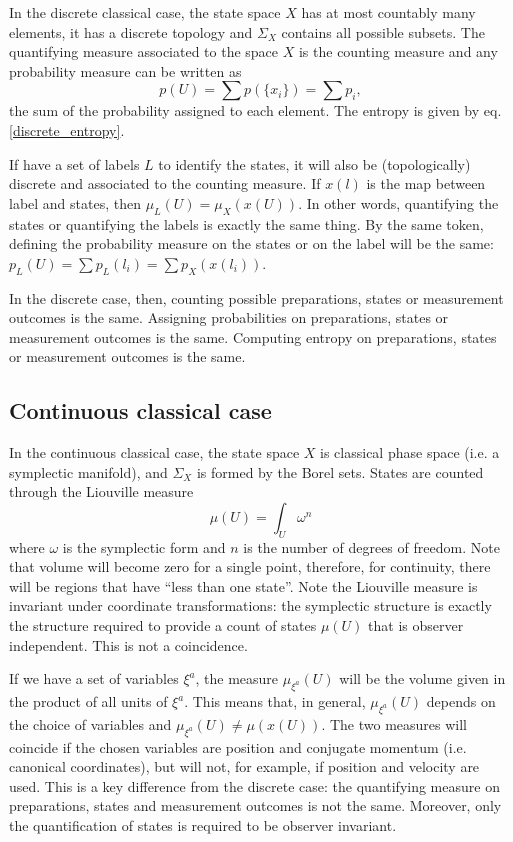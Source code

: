 \documentclass[10pt,twocolumn, nofootinbib]{revtex4-2}
\begin{document}
In the discrete classical case, the state space $X$ has at most countably many elements, it has a discrete topology and $\Sigma_X$ contains all possible subsets. The quantifying measure associated to the space $X$ is the counting measure and any probability measure can be written as
\begin{equation}
	p(U) = \sum p(\{x_i\}) = \sum p_i,
\end{equation}
the sum of the probability assigned to each element. The entropy is given by eq. \ref{discrete_entropy}.

If have a set of labels $L$ to identify the states, it will also be (topologically) discrete and associated to the counting measure. If $x(l)$ is the map between label and states, then $\mu_L(U) = \mu_X(x(U))$. In other words, quantifying the states or quantifying the labels is exactly the same thing. By the same token, defining the probability measure on the states or on the label will be the same: $p_L(U) = \sum p_L({l_i}) = \sum p_X(x(l_i))$.

In the discrete case, then, counting possible preparations, states or measurement outcomes is the same. Assigning probabilities on preparations, states or measurement outcomes is the same. Computing entropy on preparations, states or measurement outcomes is the same.

\subsection{Continuous classical case}
 
In the continuous classical case, the state space $X$ is classical phase space (i.e. a symplectic manifold), and $\Sigma_X$ is formed by the Borel sets. States are counted through the Liouville measure
\begin{equation}
	\mu(U) = \int_U \omega^n 
\end{equation}
where $\omega$ is the symplectic form and $n$ is the number of degrees of freedom. Note that volume will become zero for a single point, therefore, for continuity, there will be regions that have ``less than one state''. Note the Liouville measure is invariant under coordinate transformations: the symplectic structure is exactly the structure required to provide a count of states $\mu(U)$ that is observer independent. This is not a coincidence.

If we have a set of variables $\xi^a$, the measure $\mu_{\xi^a}(U)$ will be the volume given in the product of all units of $\xi^a$. This means that, in general, $\mu_{\xi^a}(U)$ depends on the choice of variables and $\mu_{\xi^a}(U) \neq \mu(x(U))$. The two measures will coincide if the chosen variables are position and conjugate momentum (i.e. canonical coordinates), but will not, for example, if position and velocity are used. This is a key difference from the discrete case: the quantifying measure on preparations, states and measurement outcomes is not the same. Moreover, only the quantification of states is required to be observer invariant.
\end{document}
